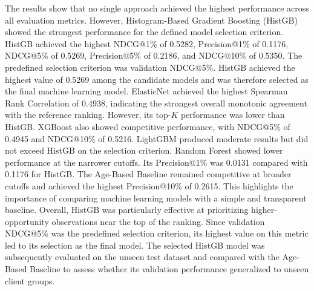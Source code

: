 \documentclass[12pt,a4paper]{report}
\begin{document}
\begin{table}[htbp]
\centering
\caption{Comparison of Candidate Models on the Validation Dataset}
\label{tab:candidate_model_comparison}
\end{table}

The results show that no single approach achieved the highest performance across all evaluation metrics. However, Histogram-Based Gradient Boosting (HistGB) showed the strongest performance for the defined model selection criterion. HistGB achieved the highest NDCG@1\% of 0.5282, Precision@1\% of 0.1176, NDCG@5\% of 0.5269, Precision@5\% of 0.2186, and NDCG@10\% of 0.5350. The predefined selection criterion was validation NDCG@5\%. HistGB achieved the highest value of 0.5269 among the candidate models and was therefore selected as the final machine learning model. ElasticNet achieved the highest Spearman Rank Correlation of 0.4938, indicating the strongest overall monotonic agreement with the reference ranking. However, its top-$K$ performance was lower than HistGB. XGBoost also showed competitive performance, with NDCG@5\% of 0.4945 and NDCG@10\% of 0.5216. LightGBM produced moderate results but did not exceed HistGB on the selection criterion. Random Forest showed lower performance at the narrower cutoffs. Its Precision@1\% was 0.0131 compared with 0.1176 for HistGB. The Age-Based Baseline remained competitive at broader cutoffs and achieved the highest Precision@10\% of 0.2615. This highlights the importance of comparing machine learning models with a simple and transparent baseline. Overall, HistGB was particularly effective at prioritizing higher-opportunity observations near the top of the ranking. Since validation NDCG@5\% was the predefined selection criterion, its highest value on this metric led to its selection as the final model. The selected HistGB model was subsequently evaluated on the unseen test dataset and compared with the Age-Based Baseline to assess whether its validation performance generalized to unseen client groups.
\end{document}
